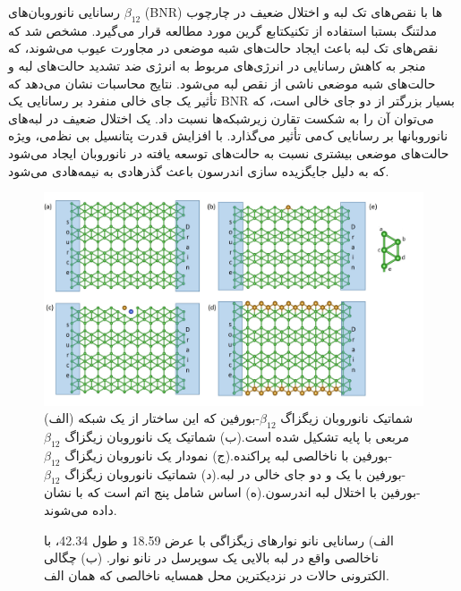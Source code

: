 رسانایی نانوروبان‌های $\beta_{12}$ (\gls{BNR}) ها با نقص‌های تک لبه و اختلال ضعیف در چارچوب مدل\gls{تنگ بست}با استفاده از تکنیک\gls{تابع گرین} مورد مطالعه قرار ‌می‌گیرد. مشخص شد که نقص‌های تک لبه باعث ایجاد حالت‌های شبه موضعی در مجاورت عیوب ‌‌می‌‌شوند، که منجر به کاهش رسانایی در انرژی‌های مربوط به انرژی ضد تشدید حالت‌های لبه و حالت‌های شبه موضعی ناشی از نقص لبه ‌‌می‌‌شود. نتایج محاسبات نشان ‌‌می‌‌دهد که تأثیر یک جای خالی منفرد بر رسانایی یک \gls{BNR} بسیار بزرگتر از دو جای خالی است، که ‌می‌‌توان آن را به شکست تقارن زیرشبکه‌ها نسبت داد. یک اختلال ضعیف در لبه‌های نانوروبانها بر رسانایی ک‌‌می‌‌ تأثیر ‌می‌‌گذارد. با افزایش قدرت پتانسیل بی نظ‌می‌، ویژه حالت‌های موضعی بیشتری نسبت به حالت‌های توسعه یافته در نانوروبان ایجاد ‌می‌‌شود که به دلیل جایگزیده سازی اندرسون باعث گذر‌هادی به نیمه‌هادی ‌‌می‌‌شود.
\begin{figure}[!ht]
  \centering
    \includegraphics[width=1\linewidth]{./figures/borophene_structure(3).JPG}
    \caption{(الف) شماتیک نانوروبان زیگزاگ $\beta_{12}$-‌بورفین که این ساختار از یک شبکه مربعی با پایه تشکیل شده است.(ب) شماتیک یک نانوروبان زیگزاگ $\beta_{12}$-‌بورفین با ناخالصی لبه پراکنده.(ج) نمودار یک نانوروبان زیگزاگ $\beta_{12}$-‌بورفین با یک و دو جای خالی در لبه.(د) شماتیک نانوروبان زیگزاگ $\beta_{12}$-‌بورفین با اختلال لبه اندرسون.(ه) اساس شامل پنج اتم است که با  نشان داده ‌‌می‌‌شوند.}
   \label{fig:borophene}
\end{figure}
  \begin{figure}[!ht]
    \centering
    
    \caption{الف) رسانایی نانو نوارهای زیگزاگی با عرض \lr{\AA}18.59 و طول \lr{\AA} 42.34، با ناخالصی واقع در لبه بالایی یک سوپرسل در نانو نوار. (ب) چگالی الکترونی حالات در نزدیکترین محل همسایه ناخالصی که همان الف.}
    \label{zigscatter}
  \end{figure}
